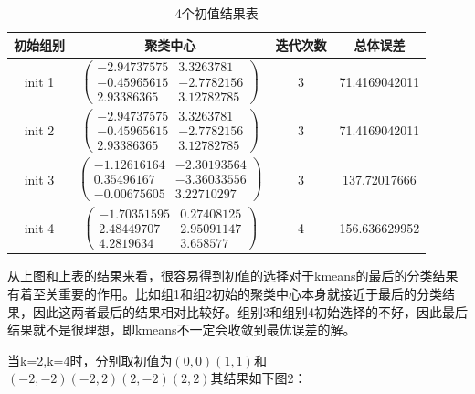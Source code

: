 \documentclass{article}
\newcommand{\hs}{\hspace{2em}}
\begin{document}
\begin{table}[htbp]
	\centering
\begin{tabular}{cccc}
	\hline
	初始组别 & 聚类中心 & 迭代次数 & 总体误差 \\
	\hline 
	init 1 & $\left( \begin{array}{cc}
		-2.94737575 & 3.3263781 \\
		-0.45965615 & -2.7782156 \\
		2.93386365 & 3.12782785
	\end{array}\right)$  & 3 & 71.4169042011  \\[0.5cm]
    init 2 & $\left(\begin{array}{cc}
    -2.94737575 & 3.3263781 \\
    -0.45965615 & -2.7782156 \\
    2.93386365 & 3.12782785
    \end{array}\right)$  & 3 & 71.4169042011  \\[0.5cm]
    init 3 & $\left( \begin{array}{cc}
    -1.12616164 & -2.30193564 \\
     0.35496167 & -3.36033556 \\
    -0.00675605 & 3.22710297
\end{array}\right)$  & 3 & 137.72017666  \\[0.5cm]
    init 4 & $\left( \begin{array}{cc}
    -1.70351595 & 0.27408125\\
    2.48449707 & 2.95091147\\
    4.2819634  & 3.658577  
\end{array}\right)$  & 4 & 156.636629952\\
\hline 
\end{tabular}
\caption{4个初值结果表}
\end{table}

\hs 从上图和上表的结果来看，很容易得到初值的选择对于kmeans的最后的分类结果有着至关重要的作用。比如组1和组2初始的聚类中心本身就接近于最后的分类结果，因此这两者最后的结果相对比较好。组别3和组别4初始选择的不好，因此最后结果就不是很理想，即kmeans不一定会收敛到最优误差的解。

\hs 当k=2,k=4时，分别取初值为$(0,0)(1,1)$和$(-2,-2)(-2,2)(2,-2)(2,2)$其结果如下图2：
\end{document}
